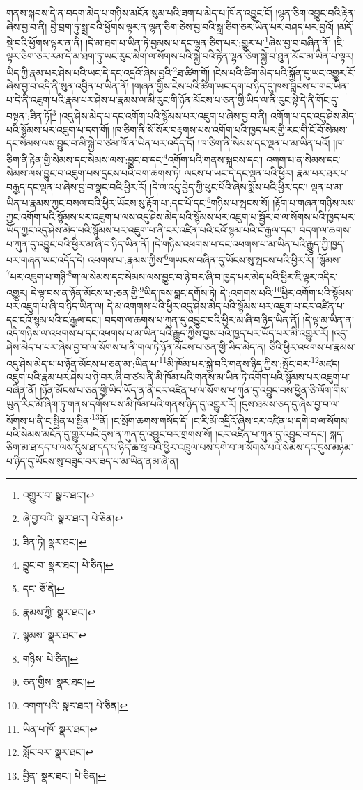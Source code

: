གནས་སྐབས་དེ་ན་བདག་མེད་པ་གཉིས་མངོན་སུམ་པའི་ཟག་པ་མེད་པ་ཁོ་ན་འབྱུང་ངོ། །ལྷན་ཅིག་འབྱུང་བའི་རྟེན་ཞེས་བྱ་བ་ནི། བྱེ་བྲག་ཏུ་སྨྲ་བའི་ཕྱོགས་ལྟར་ན་ལྷན་ཅིག་ཅེས་བྱ་བའི་སྒྲ་ཅིག་ཅར་ཡིན་པར་བཤད་པར་བྱའོ། །མདོ་སྡེ་བའི་ཕྱོགས་ལྟར་ན་ནི། །དེ་མ་ཐག་པ་ཡིན་ཏེ་བྱམས་པ་དང་ལྷན་ཅིག་པར་:གྱུར་པ་\footnote{འགྱུར་བ་  སྣར་ཐང་། }ཞེས་བྱ་བ་བཞིན་ནོ། །ཇི་ལྟར་ཅིག་ཅར་རམ་དེ་མ་ཐག་ཏུ་ཡང་རུང་མིག་ལ་སོགས་པའི་སྐྱེ་བའི་རྟེན་ལྷན་ཅིག་སྐྱེ་བ་ཐུན་མོང་མ་ཡིན་པ་ལྟར། ཡིད་ཀྱི་རྣམ་པར་ཤེས་པའི་ཡང་དེ་དང་འདྲའོ་ཞེས་བྱའི་\footnote{ཞེ་བྱ་བའི་  སྣར་ཐང་།  པེ་ཅིན། }ཐ་ཚིག་གོ། །ངེས་པའི་ཚིག་མེད་པའི་སྐྱོན་དུ་ཡང་འགྱུར་རོ་ཞེས་བྱ་བ་འདི་ནི་སུན་འབྱིན་པ་ཡིན་ནོ། །གཞན་གྱིས་ངེས་པའི་ཚིག་ཡང་དག་པ་ཉིད་དུ་ཁས་བླངས་པ་གང་ཡིན་པ་དེ་ནི་འཇུག་པའི་རྣམ་པར་ཤེས་པ་རྣམས་ལ་མི་རུང་གི་ཉོན་མོངས་པ་ཅན་གྱི་ཡིད་ལ་ནི་རུང་སྟེ་དེ་ནི་གོང་དུ་བསྟན་:ཟིན་ཏོ།\footnote{ཟིན་ཏེ།  སྣར་ཐང་། } །འདུ་ཤེས་མེད་པ་དང་འགོག་པའི་སྙོམས་པར་འཇུག་པ་ཞེས་བྱ་བ་ནི། འགོག་པ་དང་འདུ་ཤེས་མེད་པའི་སྙོམས་པར་འཇུག་པ་དག་གོ། །ཁ་ཅིག་ནི་སོ་སོར་བརྟགས་པས་འགོག་པའི་ཁྱད་པར་གྱི་རང་གི་ངོ་བོ་སེམས་དང་སེམས་ལས་བྱུང་བ་མི་སྐྱེ་བ་ཙམ་ཁོ་ན་ཡིན་པར་འདོད་དོ། །ཁ་ཅིག་ནི་སེམས་དང་ལྡན་པ་མ་ཡིན་པའོ། །ཁ་ཅིག་ནི་རྟེན་གྱི་སེམས་དང་སེམས་ལས་:བྱུང་བ་དང་\footnote{བྱུང་བ་  སྣར་ཐང་།  པེ་ཅིན། }འགོག་པའི་གནས་སྐབས་དང་། འགག་པ་ན་སེམས་དང་སེམས་ལས་བྱུང་བ་འཇུག་པས་དྲངས་པའི་བག་ཆགས་ཏེ། ལངས་པ་ཡང་དེ་དང་ལྡན་པའི་ཕྱིར། རྣམ་པར་ཐར་པ་བརྒྱད་དང་ལྡན་པ་ཞེས་བྱ་བ་སྣང་བའི་ཕྱིར་རོ། །དེ་ལ་འདུ་བྱེད་ཀྱི་ཕུང་པོའི་ཞེས་སྨོས་པའི་ཕྱིར་དང་། ལྡན་པ་མ་ཡིན་པ་རྣམས་ཀྱང་བསལ་བའི་ཕྱིར་ཡོངས་སུ་རྟོག་པ་:དང་པོ་དང་\footnote{དང་  ཅོ་ནེ། }གཉིས་པ་སྤངས་སོ། །རྟོག་པ་གཞན་གཉིས་ལས་ཀྱང་འགོག་པའི་སྙོམས་པར་འཇུག་པ་ལས་འདུ་ཤེས་མེད་པའི་སྙོམས་པར་འཇུག་པ་སྦྱོར་བ་ལ་སོགས་པའི་ཁྱད་པར་ཡོད་ཀྱང་འདུ་ཤེས་མེད་པའི་སྙོམས་པར་འཇུག་པ་ནི་ངར་འཛིན་པའི་ངའོ་སྙམ་པའི་ང་རྒྱལ་དང་། བདག་ལ་ཆགས་པ་ཀུན་དུ་འབྱུང་བའི་ཕྱིར་མ་ཞི་བ་ཉིད་ཡིན་ནོ། །དེ་གཉིས་འཕགས་པ་དང་འཕགས་པ་མ་ཡིན་པའི་རྒྱུད་ཀྱི་ཁྱད་པར་གཞན་ཡང་འདོད་དེ། འཕགས་པ་:རྣམས་ཀྱིས་\footnote{རྣམས་ཀྱི་  སྣར་ཐང་། }གཡངས་བཞིན་དུ་ཡོངས་སུ་སྤངས་པའི་ཕྱིར་རོ། །སྙོམས་\footnote{སྙམས་  སྣར་ཐང་། }པར་འཇུག་པ་གཉི་\footnote{གཉིས་  པེ་ཅིན། }ག་ལ་སེམས་དང་སེམས་ལས་བྱུང་བ་ཉེ་བར་ཞི་བ་ཁྱད་པར་མེད་པའི་ཕྱིར་ཇི་ལྟར་འདིར་འགྱུར། དེ་ལྟ་བས་ན་ཉོན་མོངས་པ་:ཅན་གྱི་\footnote{ཅན་གྱིས་  སྣར་ཐང་། }ཡིད་ཁས་བླང་དགོས་ཏེ། དེ་:འགགས་པའི་\footnote{འགག་པའི་  སྣར་ཐང་།  པེ་ཅིན། }ཕྱིར་འགོག་པའི་སྙོམས་པར་འཇུག་པ་ཞི་བ་ཉིད་ཡིན་ལ། དེ་མ་འགགས་པའི་ཕྱིར་འདུ་ཤེས་མེད་པའི་སྙོམས་པར་འཇུག་པ་ངར་འཛིན་པ་དང་ངའོ་སྙམ་པའི་ང་རྒྱལ་དང་། བདག་ལ་ཆགས་པ་ཀུན་དུ་འབྱུང་བའི་ཕྱིར་མ་ཞི་བ་ཉིད་ཡིན་ནོ། །དེ་ལྟ་མ་ཡིན་ན་འདི་གཉིས་ལ་འཕགས་པ་དང་འཕགས་པ་མ་ཡིན་པའི་རྒྱུད་ཀྱིས་བྱས་པའི་ཁྱད་པར་ཡོད་པར་མི་འགྱུར་རོ། །འདུ་ཤེས་མེད་པ་པར་ཞེས་བྱ་བ་ལ་སོགས་པ་ནི་གལ་ཏེ་ཉོན་མོངས་པ་ཅན་གྱི་ཡིད་མེད་ན། ཅིའི་ཕྱིར་འཕགས་པ་རྣམས་འདུ་ཤེས་མེད་པ་པ་ཉོན་མོངས་པ་ཅན་མ་:ཡིན་པ་\footnote{ཡིན་པ་ཁོ་  སྣར་ཐང་། }མི་ཁོམ་པར་སྐྱེ་བའི་གནས་ཉིད་ཀྱིས་:སྤོང་བར་\footnote{སློང་བར་  སྣར་ཐང་། }མཛད། འཇུག་པའི་རྣམ་པར་ཤེས་པ་ཉེ་བར་ཞི་བ་ཙམ་ནི་མི་ཁོམ་པའི་གནས་མ་ཡིན་ཏེ་འགོག་པའི་སྙོམས་པར་འཇུག་པ་བཞིན་ནོ། །ཉོན་མོངས་པ་ཅན་གྱི་ཡིད་ཡོད་ན་ནི་ངར་འཛིན་པ་ལ་སོགས་པ་ཀུན་དུ་འབྱུང་བས་ཕྱིན་ཅི་ལོག་གིས་ཡུན་རིང་མོ་ཞིག་ཏུ་གནས་དགོས་པས་མི་ཁོམ་པའི་གནས་ཉིད་དུ་འགྱུར་རོ། །དུས་ཐམས་ཅད་དུ་ཞེས་བྱ་བ་ལ་སོགས་པ་ནི་ང་སྦྱིན་པ་སྦྱིན་\footnote{བྱིན་  སྣར་ཐང་།  པེ་ཅིན། }ནོ། །ང་སྲོག་ཆགས་གསོད་དོ། །ང་རི་མོ་འདྲིའོ་ཞེས་ངར་འཛིན་པ་དགེ་བ་ལ་སོགས་པའི་སེམས་མངོན་དུ་གྱུར་པའི་དུས་ན་ཀུན་དུ་འབྱུང་བར་གྲགས་སོ། །ངར་འཛིན་པ་ཀུན་དུ་འབྱུང་བ་དང་། སྐད་ཅིག་མ་ཐ་དད་པ་ལས་དུས་ཐ་དད་པ་ཉིད་ཆ་ཕྲ་བའི་ཕྱིར་འཁྲུལ་པས་དགེ་བ་ལ་སོགས་པའི་སེམས་དང་དུས་མཉམ་པ་ཉིད་དུ་ཡོངས་སུ་བཟུང་བར་ཟད་པ་མ་ཡིན་ནམ་ཞེ་ན། 